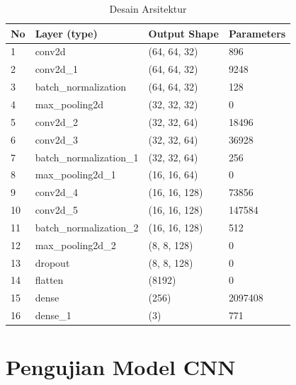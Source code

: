     \begin{table}[H]
        \centering
        \scriptsize
        \caption{Desain Arsitektur}
        \label{Desain arsitektur}
        \renewcommand{\arraystretch}{1.5}
        \begin{tabular}{p{1cm}p{4.5cm}p{4cm}p{2.5cm}}
        \hline
        \textbf{No} & \textbf{Layer (type)}   & \textbf{Output Shape} & \textbf{Parameters}  \\ \hline
        
        1 & conv2d                   & (64, 64, 32)   & 896     \\ 
        2 & conv2d\_1                & (64, 64, 32)   & 9248    \\ 
        3 & batch\_normalization     & (64, 64, 32)   & 128     \\ 
        4 & max\_pooling2d           & (32, 32, 32)   & 0       \\ 
        5 & conv2d\_2                & (32, 32, 64)   & 18496   \\ 
        6 & conv2d\_3                & (32, 32, 64)   & 36928   \\ 
        7 & batch\_normalization\_1  & (32, 32, 64)   & 256     \\ 
        8 & max\_pooling2d\_1        & (16, 16, 64)   & 0       \\ 
        9 & conv2d\_4                & (16, 16, 128)  & 73856   \\ 
        10 & conv2d\_5                & (16, 16, 128)  & 147584  \\ 
        11 & batch\_normalization\_2  & (16, 16, 128)  & 512     \\ 
        12 & max\_pooling2d\_2        & (8, 8, 128)    & 0       \\ 
        13 & dropout                  & (8, 8, 128)    & 0       \\ 
        14 & flatten                  & (8192)         & 0       \\ 
        15 & dense                    & (256)          & 2097408 \\ 
        16 & dense\_1                 & (3)            & 771     \\ \hline
        \end{tabular}
    \end{table}





\section{Pengujian Model CNN}


